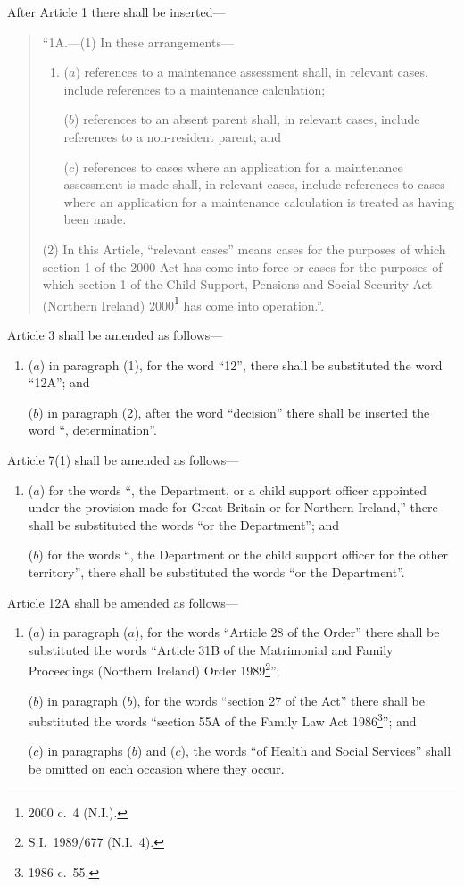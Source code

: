 \documentclass[12pt,a4paper]{article}
\begin{document}
After Article 1 there shall be inserted—
\begin{quotation}
“1A.---(1)  In these arrangements—
\begin{enumerate}\item[]
($a$) references to a maintenance assessment shall, in relevant cases, include references to a maintenance calculation;

($b$) references to an absent parent shall, in relevant cases, include references to a non-resident parent; and

($c$) references to cases where an application for a maintenance assessment is made shall, in relevant cases, include references to cases where an application for a maintenance calculation is treated as having been made.
\end{enumerate}

(2) In this Article, “relevant cases” means cases for the purposes of which section 1 of the 2000 Act has come into force or cases for the purposes of which section 1 of the Child Support, Pensions and Social Security Act (Northern Ireland) 2000\footnote{2000 c.\ 4 (N.I.).} has come into operation.”.
\end{quotation}

Article 3 shall be amended as follows—
\begin{enumerate}\item[]
($a$) in paragraph (1), for the word “12”, there shall be substituted the word “12A”; and

($b$) in paragraph (2), after the word “decision” there shall be inserted the word “, determination”.
\end{enumerate}

Article 7(1) shall be amended as follows—
\begin{enumerate}\item[]
($a$) for the words “, the Department, or a child support officer appointed under the provision made for Great Britain or for Northern Ireland,” there shall be substituted the words “or the Department”; and

($b$) for the words “, the Department or the child support officer for the other territory”, there shall be substituted the words “or the Department”.
\end{enumerate}

Article 12A shall be amended as follows—
\begin{enumerate}\item[]
($a$) in paragraph ($a$), for the words “Article 28 of the Order” there shall be substituted the words “Article 31B of the Matrimonial and Family Proceedings (Northern Ireland) Order 1989\footnote{S.I.\ 1989/677 (N.I.\ 4).}”;

($b$) in paragraph ($b$), for the words “section 27 of the Act” there shall be substituted the words “section 55A of the Family Law Act 1986\footnote{1986 c.\ 55.}”; and

($c$) in paragraphs ($b$)  and ($c$), the words “of Health and Social Services” shall be omitted on each occasion where they occur.
\end{enumerate}
\end{document}

